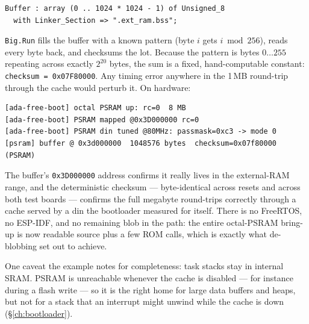 \begin{lstlisting}
Buffer : array (0 .. 1024 * 1024 - 1) of Unsigned_8
  with Linker_Section => ".ext_ram.bss";
\end{lstlisting}

\texttt{Big.Run} fills the buffer with a known pattern (byte $i$ gets $i \bmod 256$),
reads every byte back, and checksums the lot. Because the pattern is bytes
$0\ldots255$ repeating across exactly $2^{20}$ bytes, the sum is a fixed,
hand-computable constant: \texttt{checksum = 0x07F80000}. Any timing error anywhere in
the 1\,MB round-trip through the cache would perturb it. On hardware:

\begin{lstlisting}[style=sh]
[ada-free-boot] octal PSRAM up: rc=0  8 MB
[ada-free-boot] PSRAM mapped @0x3D000000 rc=0
[ada-free-boot] PSRAM din tuned @80MHz: passmask=0xc3 -> mode 0
[psram] buffer @ 0x3d000000  1048576 bytes  checksum=0x07f80000  (PSRAM)
\end{lstlisting}

The buffer's \texttt{0x3D000000} address confirms it really lives in the external-RAM
range, and the deterministic checksum --- byte-identical across resets and across both
test boards --- confirms the full megabyte round-trips correctly through a cache served
by a din the bootloader measured for itself. There is no FreeRTOS, no ESP-IDF, and no
remaining blob in the path: the entire octal-PSRAM bring-up is now readable source plus
a few ROM calls, which is exactly what de-blobbing set out to achieve.

One caveat the example notes for completeness: task stacks stay in internal SRAM. PSRAM
is unreachable whenever the cache is disabled --- for instance during a flash write ---
so it is the right home for large data buffers and heaps, but not for a stack that an
interrupt might unwind while the cache is down (\S\ref{ch:bootloader}).
